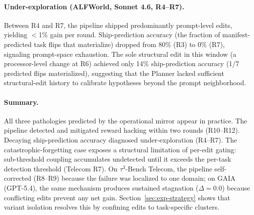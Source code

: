 \paragraph{Under-exploration (ALFWorld, Sonnet 4.6, R4--R7).}
Between R4 and R7, the pipeline shipped predominantly prompt-level edits, yielding $<$1\% gain per round. Ship-prediction accuracy (the fraction of manifest-predicted task flips that materialize) dropped from 80\% (R3) to 0\% (R7), signaling prompt-space exhaustion. The sole structural edit in this window (a processor-level change at R6) achieved only 14\% ship-prediction accuracy (1/7 predicted flips materialized), suggesting that the Planner lacked sufficient structural-edit history to calibrate hypotheses beyond the prompt neighborhood.

\paragraph{Summary.}
All three pathologies predicted by the operational mirror appear in practice. The pipeline detected and mitigated reward hacking within two rounds (R10--R12). Decaying ship-prediction accuracy diagnosed under-exploration (R4--R7). The catastrophic-forgetting case exposes a structural limitation of per-edit gating: sub-threshold coupling accumulates undetected until it exceeds the per-task detection threshold (Telecom R7). On $\tau^3$-Bench Telecom, the pipeline self-corrected (R8--R9) because the failure was localized to one domain; on GAIA (GPT-5.4), the same mechanism produces sustained stagnation ($\Delta{=}0.0$) because conflicting edits prevent any net gain. Section~\ref{sec:exp-strategy} shows that variant isolation resolves this by confining edits to task-specific clusters.

